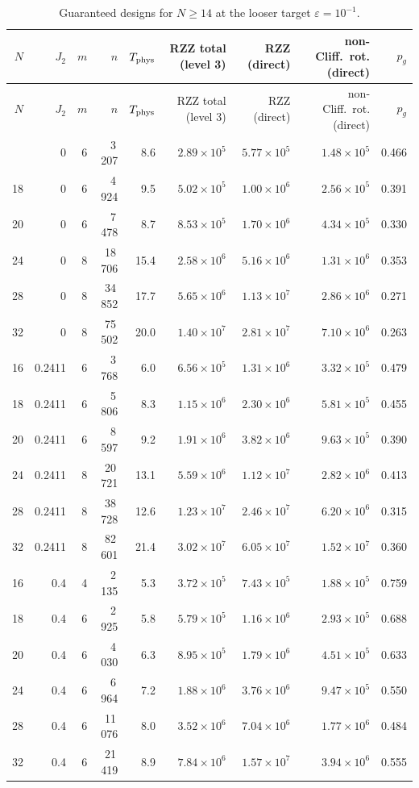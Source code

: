 \documentclass[11pt]{article}
\begin{document}
{\small
\begin{longtable}{rrrrrrrrr}
\caption{Guaranteed designs for $N\geq14$ at the looser target $\varepsilon=10^{-1}$.}\label{tab:large1}\\
\toprule
$N$ & $J_2$ & $m$ & $n$ & $T_{\rm phys}$ & RZZ total (level 3) & RZZ (direct) & non-Cliff.\ rot. (direct) & $p_g$ \\
\midrule
\endfirsthead
\toprule
$N$ & $J_2$ & $m$ & $n$ & $T_{\rm phys}$ & RZZ total (level 3) & RZZ (direct) & non-Cliff.\ rot. (direct) & $p_g$ \\
\midrule
\endhead
\bottomrule
\endfoot
16 & 0 & 6 & 3\,207 & 8.6 & $2.89\times10^{5}$ & $5.77\times10^{5}$ & $1.48\times10^{5}$ & 0.466 \\
18 & 0 & 6 & 4\,924 & 9.5 & $5.02\times10^{5}$ & $1.00\times10^{6}$ & $2.56\times10^{5}$ & 0.391 \\
20 & 0 & 6 & 7\,478 & 8.7 & $8.53\times10^{5}$ & $1.70\times10^{6}$ & $4.34\times10^{5}$ & 0.330 \\
24 & 0 & 8 & 18\,706 & 15.4 & $2.58\times10^{6}$ & $5.16\times10^{6}$ & $1.31\times10^{6}$ & 0.353 \\
28 & 0 & 8 & 34\,852 & 17.7 & $5.65\times10^{6}$ & $1.13\times10^{7}$ & $2.86\times10^{6}$ & 0.271 \\
32 & 0 & 8 & 75\,502 & 20.0 & $1.40\times10^{7}$ & $2.81\times10^{7}$ & $7.10\times10^{6}$ & 0.263 \\
16 & 0.2411 & 6 & 3\,768 & 6.0 & $6.56\times10^{5}$ & $1.31\times10^{6}$ & $3.32\times10^{5}$ & 0.479 \\
18 & 0.2411 & 6 & 5\,806 & 8.3 & $1.15\times10^{6}$ & $2.30\times10^{6}$ & $5.81\times10^{5}$ & 0.455 \\
20 & 0.2411 & 6 & 8\,597 & 9.2 & $1.91\times10^{6}$ & $3.82\times10^{6}$ & $9.63\times10^{5}$ & 0.390 \\
24 & 0.2411 & 8 & 20\,721 & 13.1 & $5.59\times10^{6}$ & $1.12\times10^{7}$ & $2.82\times10^{6}$ & 0.413 \\
28 & 0.2411 & 8 & 38\,728 & 12.6 & $1.23\times10^{7}$ & $2.46\times10^{7}$ & $6.20\times10^{6}$ & 0.315 \\
32 & 0.2411 & 8 & 82\,601 & 21.4 & $3.02\times10^{7}$ & $6.05\times10^{7}$ & $1.52\times10^{7}$ & 0.360 \\
16 & 0.4 & 4 & 2\,135 & 5.3 & $3.72\times10^{5}$ & $7.43\times10^{5}$ & $1.88\times10^{5}$ & 0.759 \\
18 & 0.4 & 6 & 2\,925 & 5.8 & $5.79\times10^{5}$ & $1.16\times10^{6}$ & $2.93\times10^{5}$ & 0.688 \\
20 & 0.4 & 6 & 4\,030 & 6.3 & $8.95\times10^{5}$ & $1.79\times10^{6}$ & $4.51\times10^{5}$ & 0.633 \\
24 & 0.4 & 6 & 6\,964 & 7.2 & $1.88\times10^{6}$ & $3.76\times10^{6}$ & $9.47\times10^{5}$ & 0.550 \\
28 & 0.4 & 6 & 11\,076 & 8.0 & $3.52\times10^{6}$ & $7.04\times10^{6}$ & $1.77\times10^{6}$ & 0.484 \\
32 & 0.4 & 6 & 21\,419 & 8.9 & $7.84\times10^{6}$ & $1.57\times10^{7}$ & $3.94\times10^{6}$ & 0.555 \\
\end{longtable}
}
\end{document}
